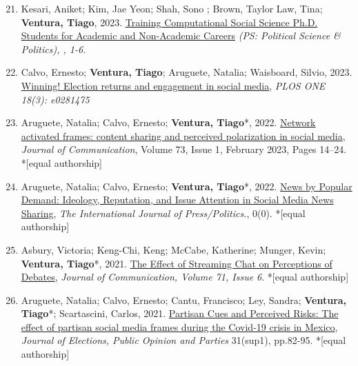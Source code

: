 \documentclass[letterpaper, 11pt]{article}
\newenvironment{benumerate}[1]{
    \let\oldItem\item
    \def\item{\addtocounter{enumi}{-2}\oldItem}
    \begin{enumerate}[leftmargin=2em]
    \setcounter{enumi}{#1}
    \addtocounter{enumi}{1}
}{
    \end{enumerate}
}
\begin{document}
\begin{benumerate}{20}
        \item Kesari, Aniket; Kim, Jae Yeon;  Shah, Sono ; Brown, Taylor Law, Tina; \textbf{Ventura, Tiago}, 2023. \href{https://www.cambridge.org/core/journals/ps-political-science-and-politics/article/training-computational-social-science-phd-students-for-academic-and-nonacademic-careers/1455690939833B9FFCAC664D4E412057}{Training Computational Social Science Ph.D. Students for Academic and Non-Academic Careers}  \textit{(PS: Political Science \& Politics), , 1-6.}

        \item Calvo, Ernesto; \textbf{Ventura, Tiago}; Aruguete, Natalia; Waisboard, Silvio, 2023. \href{https://journals.plos.org/plosone/article?id=10.1371/journal.pone.0281475}{Winning! Election returns and engagement in social media}, \textit{PLOS ONE 18(3): e0281475}

        \item Aruguete, Natalia; Calvo, Ernesto; \textbf{Ventura, Tiago}*, 2022. \href{https://academic.oup.com/joc/advance-article/doi/10.1093/joc/jqac035/6767335?searchresult=1}{Network activated frames: content sharing and perceived polarization in social media}, \textit{Journal of Communication}, Volume 73, Issue 1, February 2023, Pages 14–24.    *[equal authorship]

        \item Aruguete, Natalia; Calvo, Ernesto; \textbf{Ventura, Tiago}*, 2022. \href{https://journals.sagepub.com/doi/abs/10.1177/19401612211057068}{News by Popular Demand: Ideology, Reputation, and Issue Attention in Social Media News Sharing}, \textit{The International Journal of Press/Politics.}, 0(0). *[equal authorship]


        \item  Asbury, Victoria; Keng-Chi, Keng; McCabe, Katherine; Munger, Kevin; \textbf{Ventura, Tiago}*, 2021. \href{https://academic.oup.com/joc/article-abstract/71/6/947/6415947}{The Effect of Streaming Chat on Perceptions of Debates},  \textit{Journal of Communication, Volume 71, Issue 6}. *[equal authorship]

        \item Aruguete, Natalia; Calvo, Ernesto; Cantu, Francisco; Ley, Sandra; \textbf{Ventura, Tiago}*; Scartascini, Carlos, 2021. \href{https://www.tandfonline.com/doi/abs/10.1080/17457289.2021.1924740}{Partisan Cues and Perceived Risks: The effect of partisan social media frames during the Covid-19 crisis in Mexico},  \textit{Journal of Elections, Public Opinion and Parties} 31(sup1), pp.82-95. *[equal authorship]


\end{benumerate}
\end{document}
